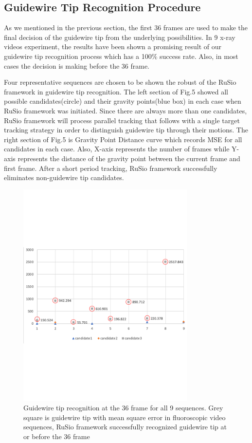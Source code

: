 \documentclass[journal]{IEEEtran}
\begin{document}
\subsection{Guidewire Tip Recognition Procedure}
As we mentioned in the previous section, the first 36 frames are used to make the final decision of the guidewire tip from the underlying possibilities. In 9 x-ray videos experiment, the results have been shown a promising result of our guidewire tip recognition process which has a 100\% success rate. Also, in most cases the decision is making before the 36 frame.
\par
Four representative sequences are chosen to be shown the robust of the RuSio framework in guidewire tip recognition. The left section of Fig.5 showed all possible candidates(circle) and their gravity points(blue box) in each case when RuSio framework was initiated. Since there are always more than one candidates, RuSio framework will process parallel tracking that follows with a single target tracking strategy in order to distinguish guidewire tip through their motions. The right section of Fig.5 is Gravity Point Distance curve which records MSE for all candidates in each case. Also, X-axis represents the number of frames while Y-axis represents the distance of the gravity point between the current frame and first frame. After a short period tracking, RuSio framework successfully eliminates non-guidewire tip candidates. 

\begin{figure}[!htbp]
	\centering 
	\includegraphics[width=3.5in]{figures/figure8}
		\caption{Guidewire tip recognition at the 36 frame for all 9 sequences. Grey square is guidewire tip with mean square error in fluoroscopic video sequences, RuSio framework successfully recognized guidewire tip at or before the 36 frame}  
	\label{fig:mcmthesis-logo} 
\end{figure}
\end{document}
